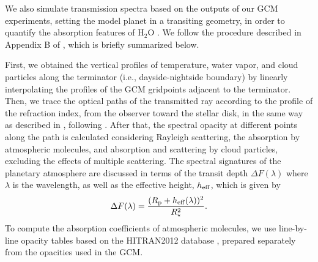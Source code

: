 \documentclass[11pt,numberedappendix,twocolappendix,]{emulateapj}
\def\water{H$_2$O }
\newcommand{\dsa}[1]{{\color{blue}#1}}
\begin{document}
We also simulate transmission spectra based on the outputs of our GCM experiments, setting the model planet in a transiting geometry, in order to quantify the absorption features of \water.  
We follow the procedure described in Appendix B of \citet{Way2017}, which is briefly summarized below. 

First, we obtained the vertical profiles of temperature, water vapor, and cloud particles along the terminator (i.e., dayside-nightside boundary) by linearly interpolating the profiles of the GCM gridpoints adjacent to the terminator. 
Then, we trace the optical paths of the transmitted ray according to the profile of the refraction index, from the observer toward the stellar disk, in the same way as described in \citet{vanderWerf2008}, following \citet{Misra2014}. 
After that, the spectral opacity at different points along the path is calculated considering Rayleigh scattering, the absorption by atmospheric molecules, and absorption and scattering by cloud particles, excluding the effects of multiple scattering. 
The spectral signatures of the planetary atmosphere are discussed in terms of the transit depth $\Delta F(\lambda )$ where $\lambda $ is the wavelength, as well as the effective height, $h_{\rm eff}$, which is given by
\begin{equation}
\Delta F(\lambda) = \frac{( R_{\rm p} + h_{\rm eff}(\lambda)  )^2}{R_{\star }^2}. 
\end{equation}
To compute the absorption coefficients of atmospheric molecules, we use line-by-line opacity tables based on the HITRAN2012 database \citep{Rothman2013}, prepared separately from the opacities used in the GCM. 

\end{document}
